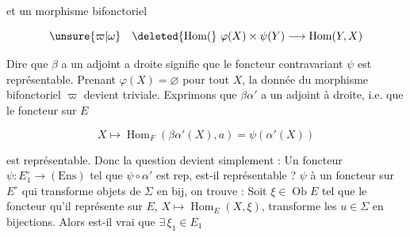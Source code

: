 et un morphisme bifonctoriel

\[\unsure{\varpi|\omega}\quad\deleted{\operatorname{Hom}(}\ \varphi(X)\times\psi(Y)\longrightarrow\operatorname{Hom}(Y,X)\]

Dire que $\beta$ a un adjoint a droite  signifie que  le foncteur contravariant $\psi$ est représentable. Prenant $\varphi(X)=\varnothing$ pour tout $X$, la donnée du morphisme bifonctoriel $\varpi$ devient triviale. Exprimons que $\beta\alpha'$ a un adjoint à droite, i.e. que le foncteur sur $E$

\[X\longmapsto\operatorname{Hom}_{F}(\beta\alpha'(X),a)=\psi(\alpha'(X))\]

est représentable. Donc la question devient simplement : Un foncteur $\psi:E_1^{\circ}\to(\mathrm{Ens})$ tel que $\psi\circ\alpha'$ est rep, est-il représentable ?  $\psi$ à un foncteur sur $E^{\circ}$ qui transforme objets de $\Sigma$ en bij, on trouve : Soit  $\xi\in\operatorname{Ob}E$ tel que le  foncteur qu'il représente sur $E$, $X\mapsto\operatorname{Hom}_E(X,\xi)$, transforme les $u\in\Sigma$  en bijections. Alors est-il vrai que $\exists\,\xi_1\in E_1$


